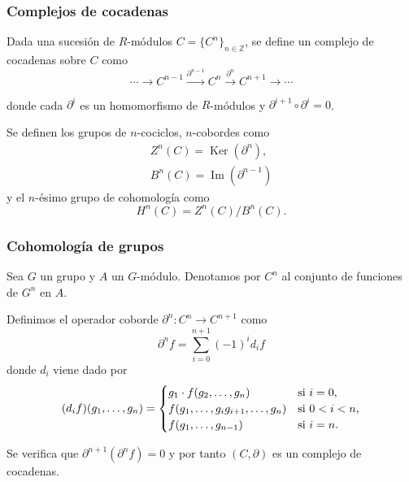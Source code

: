 \documentclass[
	11pt, %
]{beamer}
\DeclareMathOperator{\Image}{Im}
\DeclareMathOperator{\Ker}{Ker}
\newcommand{\homo}[3]{#1\colon #2\to #3}
\begin{document}
\begin{frame}
	\frametitle{Complejos de cocadenas}
	Dada una sucesión de $R$-módulos $C = \{C^n\}_{n\in\mathbb Z}$, se define un complejo de cocadenas sobre $C$ como
	\begin{equation*}
		\cdots  \xrightarrow{} C^{n-1} \xrightarrow{\partial^{n-1}} C^n \xrightarrow{\partial^n} C^{n+1} \xrightarrow{} \cdots 
	\end{equation*}
	
	donde cada $\partial^{i}$ es un homomorfismo de $R$-módulos y $\partial^{i+1}\circ \partial^i = 0$.
	
	\bigskip %
	Se definen los grupos de $n$-cociclos, $n$-cobordes como
	\begin{gather*}
		Z^n(C) = \Ker(\partial^n), \\
		B^n(C) = \Image(\partial^{n-1})
	\end{gather*}
	y el $n$-ésimo grupo de cohomología como
	\begin{equation*}
		H^n(C) = Z^n(C)/B^n(C).
	\end{equation*}
	
\end{frame}


\begin{frame}
	\frametitle{Cohomología de grupos}
	
	Sea $G$ un grupo y $A$ un $G$-módulo. Denotamos por $C^n$ al conjunto de funciones de $G^n$ en $A$.
	
	Definimos el operador coborde  $\homo {\partial^n} {C^n} {C^{n+1}}$ como
	\begin{equation*}
		\partial^n f = \sum\limits_{i=0}^{n+1} (-1)^{i} d_i f
	\end{equation*}
	donde $d_i$ viene dado por 
	\begin{equation*}
		(d_if)(g_1,\ldots,g_n) = 
		\begin{cases} 
			g_1\cdot f(g_2,\ldots,g_n) 				& \text{si $ i=0$}, \\
			f(g_1,\ldots,g_ig_{i+1},\ldots,g_n) 	& \text{si $ 0 < i <n$}, \\
			f(g_1,\ldots,g_{n-1}) 				& \text{si $ i=n$}.
		\end{cases}
	\end{equation*}
	
	Se verifica que $\partial^{n+1}(\partial^n f) = 0$ y por tanto $(C,\partial)$ es un complejo de cocadenas.
\end{frame}
\end{document}

